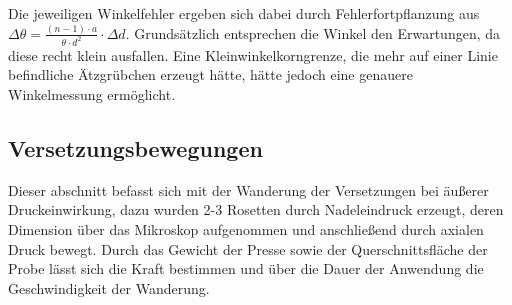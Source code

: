 		Die jeweiligen Winkelfehler ergeben sich dabei durch Fehlerfortpflanzung aus $\Delta \theta = \frac{(n-1)\cdot a}{\theta\cdot d^2}\cdot \Delta d$.
            Grundsätzlich entsprechen die Winkel den Erwartungen, da diese recht klein ausfallen. Eine Kleinwinkelkorngrenze, die mehr auf einer Linie befindliche Ätzgrübchen erzeugt hätte,
		hätte jedoch eine genauere Winkelmessung ermöglicht.
        \subsection{Versetzungsbewegungen}
            Dieser abschnitt befasst sich mit der Wanderung der Versetzungen bei äußerer Druckeinwirkung, dazu wurden 2-3 Rosetten durch Nadeleindruck erzeugt,
            deren Dimension über das Mikroskop aufgenommen und anschließend durch axialen Druck bewegt. Durch das Gewicht der Presse sowie der Querschnittsfläche der Probe
            lässt sich die Kraft bestimmen und über die Dauer der Anwendung die Geschwindigkeit der Wanderung.
